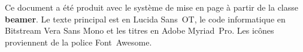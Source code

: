 \begin{frame}[plain]
  \advance\textwidth-10mm
  \hsize\textwidth
  \columnwidth\textwidth %
  \scriptsize %
  \vfill
  \begin{center}
    \begin{minipage}{0.7\textwidth}
      \raggedright %
      Ce document a été produit avec le système de mise en page
      {\XeLaTeX} à partir de la classe \textbf{beamer}. Le texte
      principal est en Lucida Sans~OT, le code informatique en
      Bitstream Vera Sans Mono et les titres en Adobe Myriad~Pro. Les
      icônes proviennent de la police Font~Awesome.
    \end{minipage}
  \end{center}
  \vfill
\end{frame}

